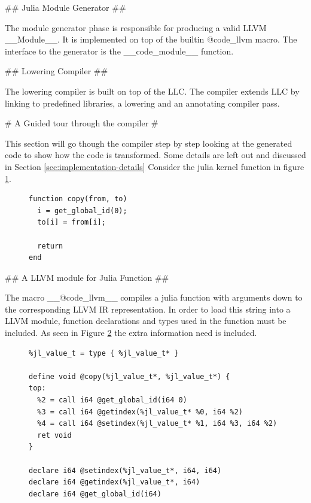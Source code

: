 \begin{markdown}
## Julia Module Generator ##

The module generator phase is responsible for producing a valid LLVM
__Module__. It is implemented on top of the builtin @code_llvm macro.
The interface to the generator is the __code_module__ function. 

## Lowering Compiler ##

The lowering compiler is built on top of the \gls{LLC}. The compiler
extends \gls{LLC} by linking to predefined libraries, a lowering and
an annotating compiler pass.

# A Guided tour through the compiler #

This section will go though the compiler step by step looking at the
generated code to show how the code is transformed. Some details are
left out and discussed in Section \ref{sec:implementation-details}
Consider the julia kernel function in figure \ref{fig:julia-copy}.

\begin{figure}[H]
  \begin{verbatim}
function copy(from, to)
  i = get_global_id(0);
  to[i] = from[i];

  return
end
  \end{verbatim}
  \caption{}
  \label{fig:julia-copy}
\end{figure}

## A LLVM module for Julia Function ##

The macro __@code\_llvm__ compiles a julia function with arguments
down to the corresponding LLVM IR representation. In order to load
this string into a LLVM module, function declarations and types used
in the function must be included. As seen in Figure
\ref{fig:copy-llvm} the extra information need is included. 

\begin{figure}[H]
  \begin{verbatim}
%jl_value_t = type { %jl_value_t* }
   
define void @copy(%jl_value_t*, %jl_value_t*) {
top:
  %2 = call i64 @get_global_id(i64 0)
  %3 = call i64 @getindex(%jl_value_t* %0, i64 %2)
  %4 = call i64 @setindex(%jl_value_t* %1, i64 %3, i64 %2)
  ret void
}

declare i64 @setindex(%jl_value_t*, i64, i64)
declare i64 @getindex(%jl_value_t*, i64)
declare i64 @get_global_id(i64)
  \end{verbatim}
  \caption{}
  \label{fig:copy-llvm}
\end{figure}


\end{markdown}
